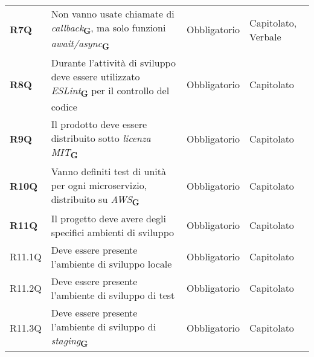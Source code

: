 \begin{center}
\begin{longtable}[!h]{p{50px} p{200px} p{100px} p{50px}}
        \textbf{R7Q}                          & Non vanno usate chiamate di \textit{callback}\textsubscript{\textbf{G}}, \newline ma solo funzioni \textit{await/async}\textsubscript{\textbf{G}}                               & Obbligatorio             & Capitolato, \newline Verbale \\
        \textbf{R8Q}                          & Durante l'attività di sviluppo deve essere utilizzato \textit{ESLint}\textsubscript{\textbf{G}} per il controllo del codice                                                     & Obbligatorio             & Capitolato                   \\
        \textbf{R9Q}                          & Il prodotto deve essere distribuito sotto \textit{licenza MIT}\textsubscript{\textbf{G}}                                                                                        & Obbligatorio             & Capitolato                   \\
        \textbf{R10Q}                         & Vanno definiti test di unità per ogni microservizio, distribuito su \textit{AWS}\textsubscript{\textbf{G}}                                                                      & Obbligatorio             & Capitolato                   \\
        \textbf{R11Q}                         & Il progetto deve avere degli specifici ambienti di sviluppo                                                                                                                     & Obbligatorio             & Capitolato                   \\
        R11.1Q                                & Deve essere presente l'ambiente di sviluppo locale                                                                                                                              & Obbligatorio             & Capitolato                   \\
        R11.2Q                                & Deve essere presente l'ambiente di sviluppo di test                                                                                                                             & Obbligatorio             & Capitolato                   \\
        R11.3Q                                & Deve essere presente l'ambiente di sviluppo di \textit{staging}\textsubscript{\textbf{G}}                                                                                       & Obbligatorio             & Capitolato                   \\
    \end{longtable}
\end{center}

